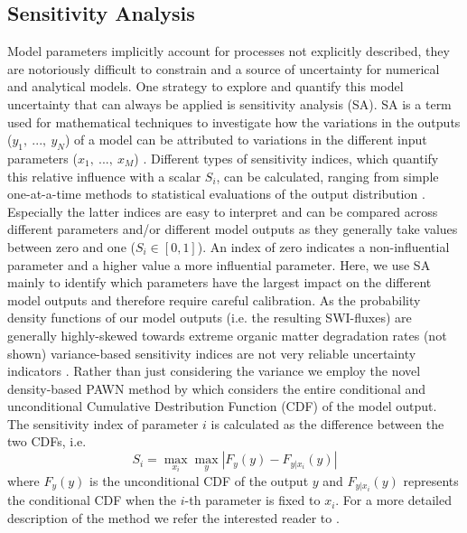 \documentclass[gmd, manuscript]{copernicus}
\begin{document}
\subsection{Sensitivity Analysis}\label{subsec:SA}
Model parameters implicitly account for processes not explicitly described, they are notoriously difficult to constrain and a source of uncertainty for numerical and analytical models. 
One strategy to explore and quantify this model uncertainty that can always be applied is sensitivity analysis (SA). SA is a term used for mathematical 
techniques to investigate how the variations in the outputs ($y_1,\ ...,\ y_N$) of a model can be attributed to variations in the different input parameters ($x_1,\ ...,\ x_M$) \citep{pianosi_sensitivity_2016}. 
Different types of sensitivity indices, which quantify this relative influence with a scalar $S_i$, can be calculated, ranging from simple one-at-a-time methods to statistical evaluations of the 
output distribution \citep[e.g. variance-based or density-based approaches][]{pianosi_sensitivity_2016}. Especially the latter indices are easy to interpret and can be compared across different parameters and/or different model outputs as 
they generally take values between zero and one ($S_i \in [0, 1]$). An index of zero indicates a non-influential parameter and a higher value a more influential parameter. 
Here, we use SA mainly to identify which parameters have the largest impact on the different model outputs and therefore require careful calibration. 
As the probability density functions of our model outputs (i.e. the resulting SWI-fluxes) are generally highly-skewed towards extreme organic matter degradation rates (not shown) variance-based sensitivity indices are not very 
reliable uncertainty indicators \citep{pianosi_sensitivity_2016}. Rather than just considering the variance we employ the novel density-based PAWN method by \citep{pianosi_simple_2015} which considers the entire conditional and unconditional 
Cumulative Destribution Function (CDF) of the model output. %
The sensitivity index of parameter $i$ is calculated as the difference between the two CDFs, i.e.
\begin{equation}
 S_i = \max_{x_i} \max_{y} | F_y(y) - F_{y|x_i}(y) |
\end{equation}
where $F_y(y)$ is the unconditional CDF of the output $y$ and $F_{y|x_i}(y)$ represents the conditional CDF when the $i$-th parameter is fixed to $x_i$. 
For a more detailed description of the method we refer the interested reader to \citet{pianosi_simple_2015}. 
\end{document}
